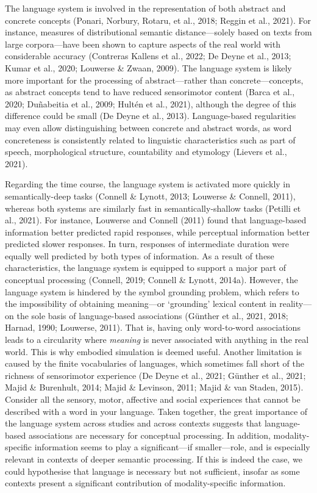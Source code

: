 \documentclass[
  12pt,
  man,floatsintext]{apa7}
\begin{document}
The language system is involved in the representation of both abstract and concrete concepts (Ponari, Norbury, Rotaru, et al., 2018; Reggin et al., 2021). For instance, measures of distributional semantic distance---solely based on texts from large corpora---have been shown to capture aspects of the real world with considerable accuracy (Contreras Kallens et al., 2022; De Deyne et al., 2013; Kumar et al., 2020; Louwerse \& Zwaan, 2009). The language system is likely more important for the processing of abstract---rather than concrete---concepts, as abstract concepts tend to have reduced sensorimotor content (Barca et al., 2020; Duñabeitia et al., 2009; Hultén et al., 2021), although the degree of this difference could be small (De Deyne et al., 2013). Language-based regularities may even allow distinguishing between concrete and abstract words, as word concreteness is consistently related to linguistic characteristics such as part of speech, morphological structure, countability and etymology (Lievers et al., 2021).

Regarding the time course, the language system is activated more quickly in semantically-deep tasks (Connell \& Lynott, 2013; Louwerse \& Connell, 2011), whereas both systems are similarly fast in semantically-shallow tasks (Petilli et al., 2021). For instance, Louwerse and Connell (2011) found that language-based information better predicted rapid responses, while perceptual information better predicted slower responses. In turn, responses of intermediate duration were equally well predicted by both types of information. As a result of these characteristics, the language system is equipped to support a major part of conceptual processing (Connell, 2019; Connell \& Lynott, 2014a). However, the language system is hindered by the symbol grounding problem, which refers to the impossibility of obtaining meaning---or `grounding' lexical content in reality---on the sole basis of language-based associations (Günther et al., 2021, 2018; Harnad, 1990; Louwerse, 2011). That is, having only word-to-word associations leads to a circularity where \emph{meaning} is never associated with anything in the real world. This is why embodied simulation is deemed useful. Another limitation is caused by the finite vocabularies of languages, which sometimes fall short of the richness of sensorimotor experience (De Deyne et al., 2021; Günther et al., 2021; Majid \& Burenhult, 2014; Majid \& Levinson, 2011; Majid \& van Staden, 2015). Consider all the sensory, motor, affective and social experiences that cannot be described with a word in your language. Taken together, the great importance of the language system across studies and across contexts suggests that language-based associations are necessary for conceptual processing. In addition, modality-specific information seems to play a significant---if smaller---role, and is especially relevant in contexts of deeper semantic processing. If this is indeed the case, we could hypothesise that language is necessary but not sufficient, insofar as some contexts present a significant contribution of modality-specific information.
\end{document}
